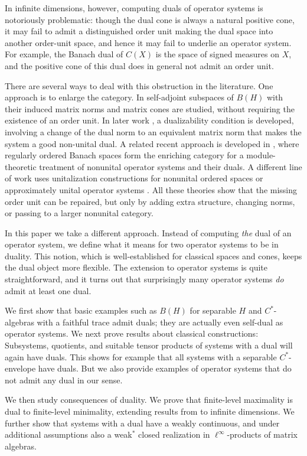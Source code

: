 \documentclass[11pt,onecolumn]{article}
\theoremstyle{plain}
\theoremstyle{definition}
\begin{document}
In infinite dimensions, however, computing duals of operator systems is
notoriously problematic: though the dual cone is always a natural positive
cone, it may fail to admit a distinguished order unit making the dual space
into another order-unit space, and hence it may fail to underlie an operator
system.  For example, the Banach dual of $C(X)$ is the space of signed
measures on $X$, and the positive cone of this dual does in general not admit an
order unit.

There are several ways to deal with this obstruction in the literature.  One
approach is to enlarge the category. In \cite{Ng2011}  self-adjoint
subspaces of $B(H)$ with their induced matrix norms and matrix cones are studied,
without requiring the existence of an order unit. In later work \cite{Ng2022}, a dualizability condition is developed, involving a change of the dual norm to an equivalent matrix norm that makes the system a good non-unital dual.  
A related recent approach is developed in \cite{FritzNetzer2026Modules}, where
regularly ordered Banach spaces form the enriching category for a
module-theoretic treatment of nonunital operator systems and their duals.
A different line of work uses unitalization constructions for nonunital ordered
spaces \cite{Werner2004,vanDobben2026} or approximately unital operator
systems  \cite{Huang2011}.  
All these theories show that
the missing order unit can be repaired, but only by adding extra structure,
changing norms, or passing to a larger nonunital  category.

In this paper we take a different approach. Instead of computing \emph{the} dual of an operator system, we define what it means for two operator systems to be in duality.
This notion, which is well-established for classical spaces and cones, keeps the dual object more flexible. The extension to operator systems is quite straightforward, and it turns out that surprisingly many operator systems \emph{do} admit at least one dual.

We  first  show that  basic examples such as $B(H)$ for separable $H$ and  $C^*$-algebras with a
faithful trace admit duals; they are actually even self-dual as operator systems. We next prove
results about classical constructions: Subsystems, quotients, and suitable tensor products of systems with a dual will again have duals. This shows for example that all systems with a separable $C^*$-envelope have duals. But we also provide examples of operator systems that do not admit any dual in our sense.

We then study consequences of  duality. We prove  that finite-level maximality is dual to finite-level minimality, extending results from \cite{DannemuellerNetzer2026Subhomogeneous} to infinite dimensions. We further show that
systems with a dual have a weakly continuous, and under additional assumptions also a weak$^*$ closed realization in
$\ell^\infty$-products of matrix algebras. 
\end{document}
